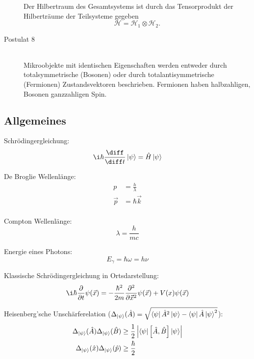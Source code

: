 \documentclass[11pt]{article}
\numberwithin{equation}{section}
\begin{document}
\begin{description}
          Der Hilbertraum des Gesamtsystems ist durch das Tensorprodukt der Hilberträume der Teilsysteme gegeben
          \begin{equation}
            \mathcal{H} = \mathcal{H}_1 \otimes \mathcal{H}_2.
          \end{equation}
        \item[Postulat 8]\hfill \\
          Mikroobjekte mit identischen Eigenschaften werden entweder durch totalsymmetrische (Bosonen) oder durch totalantisymmetrische (Fermionen) Zustandsvektoren beschrieben. Fermionen haben halbzahligen, Bosonen ganzzahligen Spin.
      \end{description}

    \subsection{Allgemeines}
      Schrödingergleichung:
      \begin{equation}
        \i\hbar\tder{}{t}\Ket{\psi} = \hat{H}\Ket{\psi}
      \end{equation}

      De Broglie Wellenlänge:
      \begin{equation}
        \begin{aligned}
          p &= \frac{h}{\lambda} \\
          \vec{p} &= \hbar \vec{k} \\
        \end{aligned}
      \end{equation}

      Compton Wellenlänge:
      \begin{equation}
        \lambda = \frac{h}{mc}
      \end{equation}

      Energie eines Photons:
      \begin{equation}
        E_\gamma = \hbar\omega = h\nu
      \end{equation}

      Klassische Schrödingergleichung in Ortsdarstellung:
      \begin{equation}
        \i\hbar\pder{}{t}\psi(\vec{x}) = -\frac{\hbar^2}{2m}\frac{\partial^2}{\partial \vec{x}^2}\psi(\vec{x}) + V(x)\psi(\vec{x})
      \end{equation}

      Heisenberg'sche Unschärferelation ($\Delta_{\Ket{\psi}} (\hat{A}) = \sqrt{\Bra{\psi}\hat{A}^2\Ket{\psi} - \Bra{\psi}\hat{A}\Ket{\psi}^2}$):
      \begin{equation}
        \begin{aligned}
          \Delta_{\Ket{\psi}}(\hat{A}) \Delta_{\Ket{\psi}}(\hat{B}) &\ge
          \frac{1}{2} \left|\Bra{\psi} \left[\hat{A},\hat{B}\right] \Ket{\psi}\right| \\
          \Delta_{\Ket{\psi}}(\hat{x}) \Delta_{\Ket{\psi}}(\hat{p}) &\ge
          \frac{\hbar}{2}
        \end{aligned}
      \end{equation}
\end{document}

